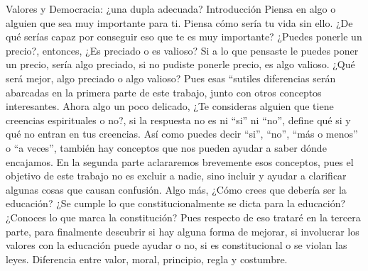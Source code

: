 Valores y Democracia: ¿una dupla adecuada?
Introducción
Piensa en algo o alguien que sea muy importante para ti. Piensa cómo sería tu vida sin ello. ¿De qué serías capaz por conseguir eso que te es muy importante? ¿Puedes ponerle un precio?, entonces, ¿Es preciado o es valioso? Si a lo que pensaste le puedes poner un precio, sería algo preciado, si no pudiste ponerle precio, es algo valioso. ¿Qué será mejor, algo preciado o algo valioso? Pues esas “sutiles diferencias serán abarcadas en la primera parte de este trabajo, junto con otros conceptos interesantes.
Ahora algo un poco delicado, ¿Te consideras alguien que tiene creencias espirituales o no?, si la respuesta no es ni “si” ni “no”, define qué si y qué no entran en tus creencias. Así como puedes decir “si”, “no”, “más o menos” o “a veces”, también hay conceptos que nos pueden ayudar a saber dónde encajamos. En la segunda parte aclararemos brevemente esos conceptos, pues el objetivo de este trabajo no es excluir a nadie, sino incluir y ayudar a clarificar algunas cosas que causan confusión.
Algo más, ¿Cómo crees que debería ser la educación? ¿Se cumple lo que constitucionalmente se dicta para la educación? ¿Conoces lo que marca la constitución? Pues respecto de eso trataré en la tercera parte, para finalmente descubrir si hay alguna forma de mejorar, si involucrar los valores con la educación puede ayudar o no, si es constitucional o se violan las leyes.
Diferencia entre valor, moral, principio, regla y costumbre.
